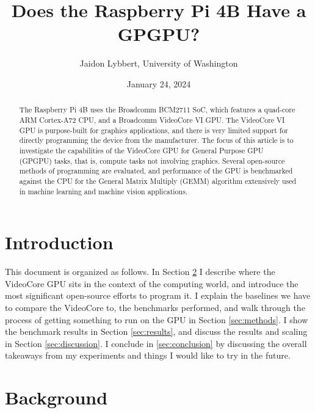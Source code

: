 \documentclass[12pt]{article}
\begin{document}
\title{Does the Raspberry Pi 4B Have a GPGPU?}
\author{Jaidon Lybbert, University of Washington}
\date{January 24, 2024}

\maketitle

\begin{abstract}
The Raspberry Pi 4B uses the Broadcomm BCM2711 SoC, which features a quad-core ARM Cortex-A72 CPU, and a Broadcomm VideoCore VI GPU. The VideoCore VI GPU is purpose-built for graphics applications, and there is very limited support for directly programming the device from the manufacturer. The focus of this article is to investigate the capabilities of the VideoCore GPU for General Purpose GPU (GPGPU) tasks, that is, compute tasks not involving graphics. Several open-source methods of programming are evaluated, and performance of the GPU is benchmarked against the CPU for the General Matrix Multiply (GEMM) algorithm extensively used in machine learning and machine vision applications.
\end{abstract}

\section{Introduction}
This document is organized as follows. In Section \ref{sec:background} I describe where the VideoCore GPU sits in the context of the computing world, and introduce the most significant open-source efforts to program it. I explain the baselines we have to compare the VideoCore to, the benchmarks performed, and walk through the process of getting something to run on the GPU in Section \ref{sec:methods}. I show the benchmark results in Section \ref{sec:results}, and discuss the results and scaling in Section \ref{sec:discussion}. I conclude in \ref{sec:conclusion} by discussing the overall takeaways from my experiments and things I would like to try in the future.

\section{Background}\label{sec:background}
\end{document}
